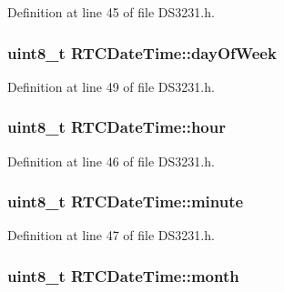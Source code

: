 Definition at line 45 of file D\+S3231.\+h.

\subsubsection[{\texorpdfstring{day\+Of\+Week}{dayOfWeek}}]{\setlength{\rightskip}{0pt plus 5cm}uint8\+\_\+t R\+T\+C\+Date\+Time\+::day\+Of\+Week}\hypertarget{struct_r_t_c_date_time_a3fa952239e8a35b7ec390838ae1a6bd0}{}\label{struct_r_t_c_date_time_a3fa952239e8a35b7ec390838ae1a6bd0}


Definition at line 49 of file D\+S3231.\+h.

\subsubsection[{\texorpdfstring{hour}{hour}}]{\setlength{\rightskip}{0pt plus 5cm}uint8\+\_\+t R\+T\+C\+Date\+Time\+::hour}\hypertarget{struct_r_t_c_date_time_aaf23cb6337a6c0cb3bb69ad815f9c1b1}{}\label{struct_r_t_c_date_time_aaf23cb6337a6c0cb3bb69ad815f9c1b1}


Definition at line 46 of file D\+S3231.\+h.

\subsubsection[{\texorpdfstring{minute}{minute}}]{\setlength{\rightskip}{0pt plus 5cm}uint8\+\_\+t R\+T\+C\+Date\+Time\+::minute}\hypertarget{struct_r_t_c_date_time_a2e9c4e2b54185ec5bb7f328732bc1c63}{}\label{struct_r_t_c_date_time_a2e9c4e2b54185ec5bb7f328732bc1c63}


Definition at line 47 of file D\+S3231.\+h.

\subsubsection[{\texorpdfstring{month}{month}}]{\setlength{\rightskip}{0pt plus 5cm}uint8\+\_\+t R\+T\+C\+Date\+Time\+::month}\hypertarget{struct_r_t_c_date_time_a434dc70ef64a1e99201f3765607e8afa}{}\label{struct_r_t_c_date_time_a434dc70ef64a1e99201f3765607e8afa}


